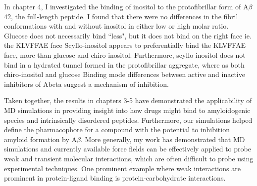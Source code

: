 In chapter 4, I investigated the binding of inositol to the protofibrillar form of A$\beta$42, the full-length peptide. I found that there were no differences in the fibril conformations with and without inositol in either low or high molar ratio.
Glucose does not necessarily bind ``less", but it does not bind on the right face ie. the KLVFFAE face Scyllo-inositol appears to preferentially bind the KLVFFAE face, more than glucose and chiro-inositol.  Furthermore, scyllo-inositol does not bind in a hydrated tunnel formed in the protofibrillar aggregate, where as both chiro-inositol and glucose Binding mode differences between active and inactive inhibitors of Abeta suggest a mechanism of inhibition.

Taken together, the results in chapters 3-5 have demonstrated the applicability of MD simulations in providing insight into how drugs might bind to amyloidogenic species and intrinsically disordered peptides.  Furthermore, our simulations helped define the pharmacophore for a compound with the potential to inhibition amyloid formation by A$\beta$. More generally, my work has demonstrated that MD simulations and currently available force fields can be effectively applied to probe weak and transient molecular interactions, which are often difficult to probe using experimental techniques. One prominent example where weak interactions are prominent in protein-ligand binding is protein-carbohydrate interactions.\cite{weak binding review paper}


